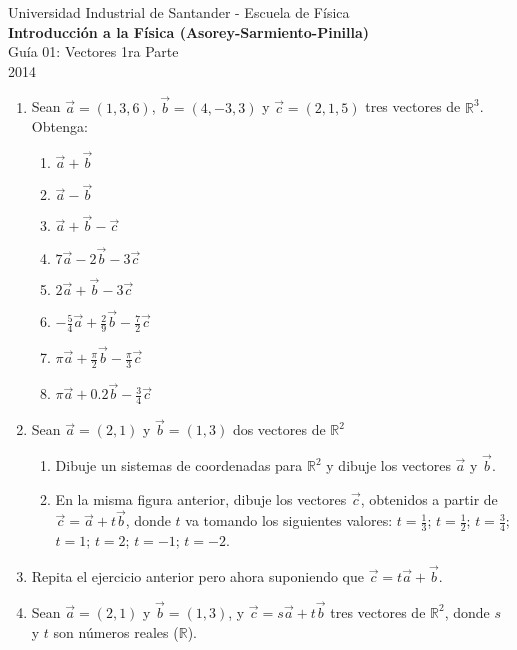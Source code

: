 \documentclass[a4paper,12pt]{article}
\begin{document}
\begin{center}
  {\small{Universidad Industrial de Santander - Escuela de Física}}\\
  {\bf{Introducción a la Física (Asorey-Sarmiento-Pinilla)}}\\
  \vspace{0.4cm}
  Guía 01: Vectores 1ra Parte\\ 2014
\end{center}

\renewcommand{\labelenumi}{\arabic{enumi})}
\renewcommand{\labelenumii}{\arabic{enumii})}


\begin{enumerate}
  \item Sean $\vec a=(1,3,6)$,  $\vec b=(4,-3,3)$ y $\vec c=(2,1,5)$  tres vectores de $\mathbb{R}^3$. Obtenga: 
    \begin{enumerate}
      \item $\vec a + \vec b$
      \item $\vec a - \vec b$
      \item $\vec a + \vec b - \vec c$
      \item $7 \vec a - 2 \vec b - 3 \vec c$
      \item $2 \vec a + \vec b - 3 \vec c$
      \item $-\frac54  \vec a + \frac29 \vec b - \frac72 \vec c$
      \item $\pi  \vec a + \frac\pi 2 \vec b - \frac\pi 3 \vec c$
      \item $\pi  \vec a + 0.2 \vec b - \frac34 \vec c$
    \end{enumerate}
  \item Sean $\vec a=(2,1)$ y $\vec b=(1,3)$ dos vectores de $\mathbb{R}^2$
    \begin{enumerate}
      \item Dibuje un sistemas de coordenadas para $\mathbb{R}^2$ y dibuje los vectores $\vec a$ y $\vec b$. 
      \item En la misma figura anterior, dibuje los vectores $\vec c$, obtenidos a partir de $\vec c=\vec a + t \vec b$, donde $t$ va tomando los siguientes valores: $t=\frac13$;  $t=\frac12$;  $t=\frac34$;  $t=1$;  $t=2$;  $t=-1$;  $t=-2$.
    \end{enumerate}
  \item Repita el ejercicio anterior pero ahora suponiendo que $\vec c = t \vec a + \vec b$.
  \item Sean $\vec a= (2, 1)$ y $\vec b=(1, 3)$, y $\vec c = s \vec a + t \vec b$ tres vectores de $\mathbb R^2$, donde $s$ y $t$ son números reales ($\mathbb R$). 

\end{enumerate}
\end{document}
